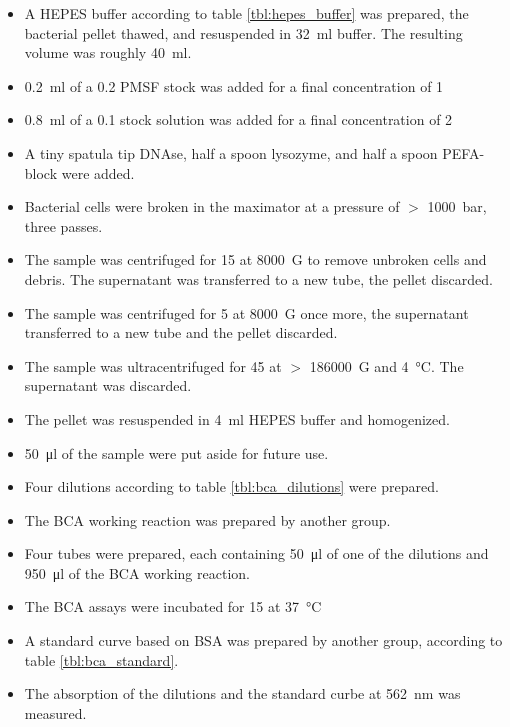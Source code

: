 \documentclass[a4paper]{scrreprt}
\begin{document}
\begin{itemize}
	\item A HEPES buffer according to table \ref{tbl:hepes_buffer} was
		prepared, the bacterial pellet thawed, and resuspended in
		\SI{32}{\ml} buffer. The resulting volume was roughly
		\SI{40}{\ml}.
	\item \SI{0.2}{\ml} of a \SI{0.2}{\Molar} PMSF stock was added for a
		final concentration of \SI{1}{\milli\Molar}
	\item \SI{0.8}{\ml} of a \SI{0.1}{\Molar}  stock solution was
		added for a final concentration of \SI{2}{\milli\Molar}
	\item A tiny spatula tip DNAse, half a spoon lysozyme, and half a spoon
		PEFA-block were added.
	\item Bacterial cells were broken in the maximator at a pressure of $>$
		\SI{1000}{\bar}, three passes.
	\item The sample was centrifuged for \SI{15}{\min} at \SI{8000}{G} to
		remove unbroken cells and debris. The supernatant was
		transferred to a new tube, the pellet discarded. 
	\item The sample was centrifuged for \SI{5}{\min} at \SI{8000}{G} once
		more, the supernatant transferred to a new tube and the pellet
		discarded.
	\item The sample was ultracentrifuged for \SI{45}{\min} at $>$
		\SI{186000}{G} and \SI{4}{\celsius}. The supernatant was
		discarded.
	\item The pellet was resuspended in \SI{4}{\ml} HEPES buffer and
		homogenized.
	\item \SI{50}{\ul} of the sample were put aside for future use.
	\item Four dilutions according to table \ref{tbl:bca_dilutions} were
		prepared.
	\item The BCA working reaction was prepared by another group.
	\item Four tubes were prepared, each containing \SI{50}{\ul} of one of
		the dilutions and \SI{950}{\ul} of the BCA working reaction.
	\item The BCA assays were incubated for \SI{15}{\min} at \SI{37}{\celsius}
	\item A standard curve based on BSA was prepared by another group,
		according to table \ref{tbl:bca_standard}.
	\item The absorption of the dilutions and the standard curbe at
		\SI{562}{\nm} was measured. %
\end{itemize}
\end{document}

